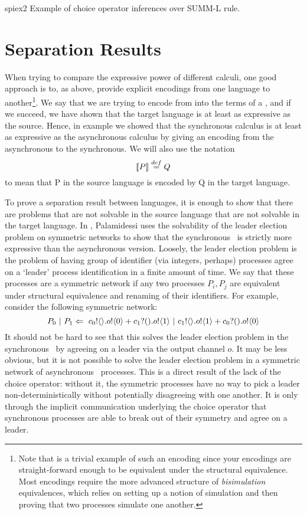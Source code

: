 \begin{example}{spiex2}
	Example of choice operator inferences over SUMM-L rule.
\end{example}

\section{Separation Results}\label{Separation Results}
When trying to compare the expressive power of different calculi, one good approach is to, as above, provide explicit encodings from one language to another\footnote{Note that  is a trivial example of such an encoding since your encodings are straight-forward enough to be equivalent under the structural equivalence.  Most encodings require the more advanced structure of \emph{bisimulation} equivalences, which relies on setting up a notion of simulation and then proving that two processes simulate one another.}.  We say that we are trying to encode from  into the terms of a , and if we succeed, we have shown that the target language is at least as expressive as the source.  Hence, in example  we showed that the synchronous calculus is at least as expressive as the asynchronous calculus by giving an encoding from the asynchronous to the synchronous.  We will also use the notation
\[
	\llbracket{P}\rrbracket \overset{\tiny{def}}{=} Q
\]
to mean that P in the source language is encoded by Q in the target language.

To prove a separation result between languages, it is enough to show that there are problems that are not solvable in the source language that are not solvable in the target language.  In \cite{palam03}, Palamidessi uses the solvability of the leader election problem on symmetric networks to show that the synchronous \picalc\ is strictly more expressive than the asynchronous version.  Loosely, the leader election problem is the problem of having group of identifier (via integers, perhaps) processes agree on a `leader' process identification in a finite amount of time.  We say that these processes are a symmetric network if any two processes $P_i, P_j$ are equivalent under structural equivalence and renaming of their identifiers.  For example, consider the following symmetric network:
\[
	P_0\ |\  P_1 \Leftarrow\  {c_0}!\langle{}\rangle. {o}!\langle{0}\rangle + {c_1}?({}). {o}!\langle{1}\rangle \ |\  {c_1}!\langle{}\rangle. {o}!\langle{1}\rangle + {c_0}?({}). {o}!\langle{0}\rangle
\]
It should not be hard to see that this solves the leader election problem in the synchronous \picalc\ by agreeing on a leader via the output channel $o$.  It may be less obvious, but it is not possible to solve the leader election problem in a symmetric network of asynchronous \picalc\ processes.  This is a direct result of the lack of the choice operator: without it, the symmetric processes have no way to pick a leader non-deterministically without potentially disagreeing with one another.  It is only through the implicit communication underlying the choice operator that synchronous processes are able to break out of their symmetry and agree on a leader.

